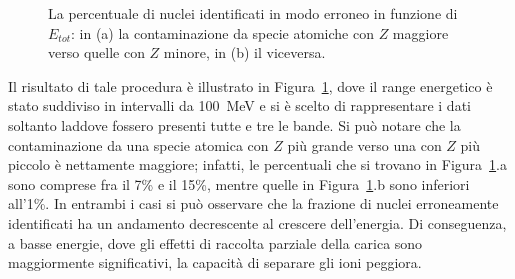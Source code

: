 \begin{figure}[!p] 
	\centering
	\hspace{10mm}
	\caption{La percentuale di nuclei identificati in modo erroneo in funzione di $E_{tot}$: in (a) la contaminazione da specie atomiche con $Z$ maggiore verso quelle con $Z$ minore, in (b) il viceversa.} \label{fig:leakage}
\end{figure}


Il risultato di tale procedura è illustrato in Figura~\ref{fig:leakage}, dove il range energetico è stato suddiviso in intervalli da 100~MeV e si è scelto di rappresentare i dati soltanto laddove fossero presenti tutte e tre le bande.
Si può notare che la contaminazione da una specie atomica con $Z$ più grande verso una con $Z$ più piccolo è nettamente maggiore; infatti, le percentuali che si trovano in Figura~\ref{fig:leakage}.a sono comprese fra il 7\% e il 15\%, mentre quelle in Figura~\ref{fig:leakage}.b sono inferiori all'1\%.
In entrambi i casi si può osservare che la frazione di nuclei erroneamente identificati ha un andamento decrescente al crescere dell'energia.
Di conseguenza, a basse energie, dove gli effetti di raccolta parziale della carica sono maggiormente significativi, la capacità di separare gli ioni peggiora.







